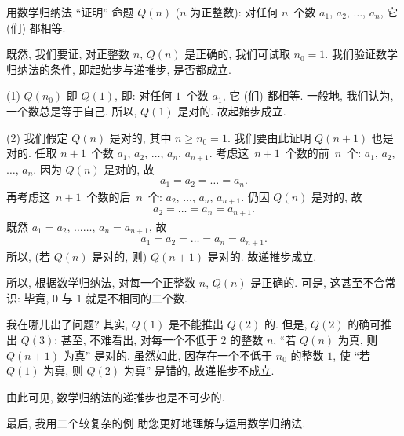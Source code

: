 \begin{example}[缺递推步]
    用数学归纳法 ``证明'' 命题 \(Q(n)\) (\(n\) 为正整数):
    对任何 \(n\)~个数 \(a_1\), \(a_2\), \(\dots\), \(a_n\),
    它 (们) 都相等.

    既然, 我们要证, 对正整数 \(n\),
    \(Q(n)\) 是正确的,
    我们可试取 \(n_0 = 1\).
    我们验证数学归纳法的条件,
    即起始步与递推步,
    是否都成立.

    (1)
    \(Q(n_0)\) 即 \(Q(1)\), 即:
    对任何 \(1\)~个数 \(a_1\), 它 (们) 都相等.
    一般地, 我们认为, 一个数总是等于自己.
    所以, \(Q(1)\) 是对的.
    故起始步成立.

    (2)
    我们假定 \(Q(n)\) 是对的, 其中 \(n \geq n_0 = 1\).
    我们要由此证明 \(Q(n+1)\) 也是对的.
    任取 \(n+1\)~个数
    \(a_1\), \(a_2\), \(\dots\), \(a_n\), \(a_{n+1}\).
    考虑这~\(n+1\)~个数的前~\(n\)~个:
    \(a_1\), \(a_2\), \(\dots\), \(a_n\).
    因为 \(Q(n)\) 是对的, 故
    \begin{align*}
        a_1 = a_2 = \dots = a_n.
    \end{align*}
    再考虑这~\(n+1\)~个数的后~\(n\)~个:
    \(a_2\), \(\dots\), \(a_n\), \(a_{n+1}\).
    仍因 \(Q(n)\) 是对的, 故
    \begin{align*}
        a_2 = \dots = a_n = a_{n+1}.
    \end{align*}
    既然 \(a_1 = a_2\), \(\dots \dots\), \(a_n = a_{n+1}\), 故
    \begin{align*}
        a_1 = a_2 = \dots = a_n = a_{n+1}.
    \end{align*}
    所以, (若 \(Q(n)\) 是对的, 则) \(Q(n+1)\) 是对的.
    故递推步成立.

    所以, 根据数学归纳法,
    对每一个正整数 \(n\), \(Q(n)\) 是正确的.
    可是, 这甚至不合常识:
    毕竟, \(0\) 与 \(1\) 就是不相同的二个数.

    我在哪儿出了问题?
    其实, \(Q(1)\) 是不能推出 \(Q(2)\) 的.
    但是, \(Q(2)\) 的确可推出 \(Q(3)\);
    甚至, 不难看出, 对每一个不低于 \(2\) 的整数 \(n\),
    ``若 \(Q(n)\) 为真, 则 \(Q(n+1)\) 为真''
    是对的.
    虽然如此,
    因存在一个不低于 \(n_0\) 的整数 \(1\),
    使 ``若 \(Q(1)\) 为真, 则 \(Q(2)\) 为真''
    是错的,
    故递推步不成立.

    由此可见, 数学归纳法的递推步也是不可少的.
\end{example}

最后, 我用二个较复杂的例%
助您更好地理解与运用数学归纳法.

